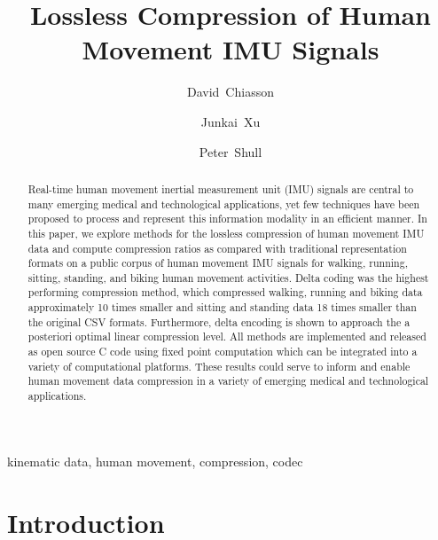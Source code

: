 \documentclass[journal]{IEEEtran}
\begin{document}
\title{Lossless Compression of Human Movement IMU Signals}

\author[1]{David~Chiasson}
\author[1]{Junkai~Xu}
\author[1]{Peter~Shull}

\maketitle

\begin{abstract}
Real-time human movement inertial measurement unit (IMU) signals are central to many emerging medical and technological applications, yet few techniques have been proposed to process and represent this information modality in an efficient manner. In this paper, we explore methods for the lossless compression of human movement IMU data and compute compression ratios as compared with traditional representation formats on a public corpus of human movement IMU signals for walking, running, sitting, standing, and biking human movement activities. Delta coding was the highest performing compression method, which compressed walking, running and biking data approximately 10 times smaller and sitting and standing data 18 times smaller than the original CSV formats. Furthermore, delta encoding is shown to approach the a posteriori optimal linear compression level. All methods are implemented and released as open source C code using fixed point computation which can be integrated into a variety of computational platforms. These results could serve to inform and enable human movement data compression in a variety of emerging medical and technological applications.
\end{abstract}

\begin{IEEEkeywords}
kinematic data, human movement, compression, codec
\end{IEEEkeywords}



\section{Introduction}
\end{document}

